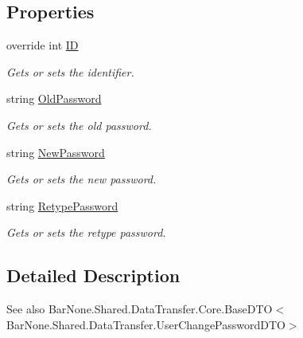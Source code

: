 \subsection*{Properties}
\begin{DoxyCompactItemize}
\item 
override int \mbox{\hyperlink{class_bar_none_1_1_shared_1_1_data_transfer_1_1_user_change_password_d_t_o_a7814151bb990142eb035fbb2bb66a207}{ID}}
\begin{DoxyCompactList}\small\item\em Gets or sets the identifier. \end{DoxyCompactList}\item 
string \mbox{\hyperlink{class_bar_none_1_1_shared_1_1_data_transfer_1_1_user_change_password_d_t_o_ae4bd53e5a17b360ef75ca435f4aea487}{Old\+Password}}
\begin{DoxyCompactList}\small\item\em Gets or sets the old password. \end{DoxyCompactList}\item 
string \mbox{\hyperlink{class_bar_none_1_1_shared_1_1_data_transfer_1_1_user_change_password_d_t_o_aff329c5c4775505081db203a2c1e9fff}{New\+Password}}
\begin{DoxyCompactList}\small\item\em Gets or sets the new password. \end{DoxyCompactList}\item 
string \mbox{\hyperlink{class_bar_none_1_1_shared_1_1_data_transfer_1_1_user_change_password_d_t_o_aa3e4a2c9aa3eec45a2df1ef95415995b}{Retype\+Password}}
\begin{DoxyCompactList}\small\item\em Gets or sets the retype password. \end{DoxyCompactList}\end{DoxyCompactItemize}


\subsection{Detailed Description}


\begin{DoxySeeAlso}{See also}
Bar\+None.\+Shared.\+Data\+Transfer.\+Core.\+Base\+D\+T\+O$<$\+Bar\+None.\+Shared.\+Data\+Transfer.\+User\+Change\+Password\+D\+T\+O$>$


\end{DoxySeeAlso}


